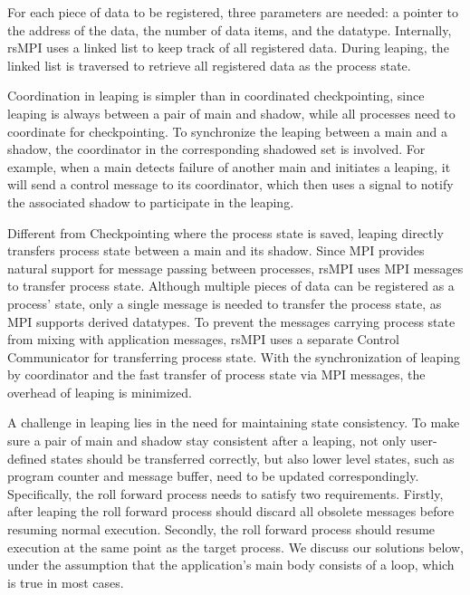 For each piece of data to be registered, three parameters are needed: a pointer to the address of the data, the number of data items, and the datatype. Internally, rsMPI uses a linked list to keep track of all registered data. %
During leaping, the linked list is traversed to retrieve all registered data as the process state.

Coordination in leaping is simpler than in coordinated checkpointing, since leaping is always between a pair of main and shadow, while all processes need to coordinate for checkpointing. To synchronize the leaping between a main and a shadow, the coordinator in the corresponding shadowed set is involved. For example, when a main detects failure of another main and initiates a leaping, it will send a control message to its coordinator, which then uses a signal to notify the associated shadow to participate in the leaping. 

Different from Checkpointing where the process state is saved, leaping directly transfers process state between a main and its shadow. 
Since MPI provides natural support for message passing between processes, 
rsMPI uses MPI messages to transfer process state. Although multiple pieces of data can be registered as a process' state, only a single message is needed to transfer the process state, as MPI supports derived datatypes. To prevent the messages carrying process state from mixing with application messages, rsMPI uses a separate Control Communicator for transferring process state. With the synchronization of leaping by coordinator and the fast transfer of process state via MPI messages, the overhead of leaping is minimized. 

A challenge in leaping lies in the need for maintaining state consistency. To make sure a pair of main and shadow stay consistent after a leaping, not only user-defined states should be transferred correctly, but also lower level states, such as program counter and message buffer, need to be updated correspondingly. Specifically, the roll forward process needs to satisfy two requirements. 
Firstly, after leaping the roll forward process should discard all obsolete messages before resuming normal execution. Secondly, the roll forward process should resume execution at the same point as the target process. We discuss our solutions below, under the assumption that the application's main body consists of a loop, which is true in most cases. 

